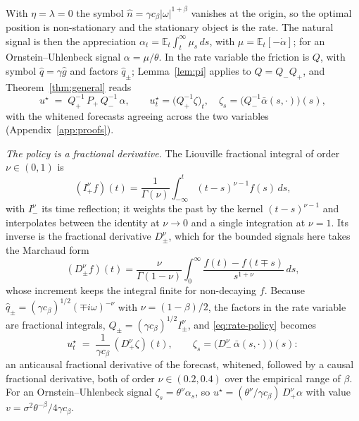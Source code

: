 \documentclass[11pt]{article}
\newcommand{\E}{\mathbb{E}}
\theoremstyle{plain}
\theoremstyle{definition}
\theoremstyle{remark}
\begin{document}
With $\eta=\lambda=0$ the symbol $\hat n=\gamma c_\beta|\omega|^{1+\beta}$ vanishes at the origin, so the optimal position is non-stationary and the stationary object is the rate. The natural signal is then the appreciation $\alpha_t=\E_t\int_t^\infty\mu_s\,ds$, with $\mu=\E_t[-\dot\alpha]$; for an Ornstein--Uhlenbeck signal $\alpha=\mu/\theta$. In the rate variable the friction is $Q$, with symbol $\hat q=\gamma\hat g$ and factors $\hat q_\pm$; Lemma~\ref{lem:pi} applies to $Q=Q_-Q_+$, and Theorem~\ref{thm:general} reads
\begin{equation}\label{eq:rate-policy}
u^\star \;=\; Q_+^{-1}\,P_+\,Q_-^{-1}\,\alpha,
\qquad u^\star_t=\bigl(Q_+^{-1}\zeta\bigr)_t,\quad \zeta_s=\bigl(Q_-^{-1}\bar\alpha(s,\cdot)\bigr)(s),
\end{equation}
with the whitened forecasts agreeing across the two variables (Appendix~\ref{app:proofs}).

\emph{The policy is a fractional derivative.} The Liouville fractional integral of order $\nu\in(0,1)$ is
\[
(I^\nu_+f)(t)=\frac{1}{\Gamma(\nu)}\int_{-\infty}^t(t-s)^{\nu-1}f(s)\,ds,
\]
with $I^\nu_-$ its time reflection; it weights the past by the kernel $(t-s)^{\nu-1}$ and interpolates between the identity at $\nu\to0$ and a single integration at $\nu=1$. Its inverse is the fractional derivative $D^\nu_\pm$, which for the bounded signals here takes the Marchaud form \citep{SamkoKilbasMarichev1993}
\[
(D^\nu_\pm f)(t)=\frac{\nu}{\Gamma(1-\nu)}\int_0^\infty\frac{f(t)-f(t\mp s)}{s^{1+\nu}}\,ds ,
\]
whose increment keeps the integral finite for non-decaying $f$. Because $\hat q_\pm=(\gamma c_\beta)^{1/2}(\mp i\omega)^{-\nu}$ with $\nu=(1-\beta)/2$, the factors in the rate variable are fractional integrals, $Q_\pm=(\gamma c_\beta)^{1/2}I^\nu_\pm$, and \eqref{eq:rate-policy} becomes
\begin{equation}\label{eq:fractional}
u^\star_t \;=\; \frac{1}{\gamma c_\beta}\,(D^\nu_+\zeta)(t),
\qquad \zeta_s=\bigl(D^\nu_-\,\bar\alpha(s,\cdot)\bigr)(s):
\end{equation}
an anticausal fractional derivative of the forecast, whitened, followed by a causal fractional derivative, both of order $\nu\in(0.2,0.4)$ over the empirical range of $\beta$. For an Ornstein--Uhlenbeck signal $\zeta_s=\theta^\nu\alpha_s$, so $u^\star=(\theta^\nu/\gamma c_\beta)\,D^\nu_+\alpha$ with value $v=\sigma^2\theta^{-\beta}/4\gamma c_\beta$.
\end{document}
